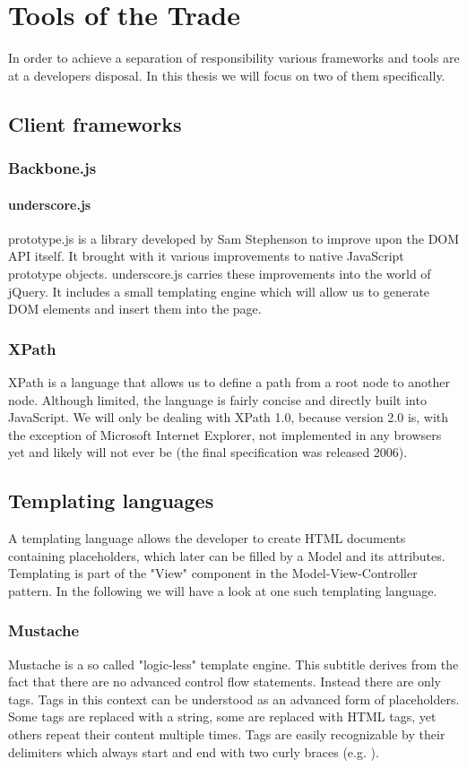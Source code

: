 \documentclass[thesis.tex]{subfiles}
\begin{document}
\chapter{Tools of the Trade}
\label{chap:tools}
In order to achieve a separation of responsibility various frameworks and tools
are at a developers disposal. In this thesis we will focus on two of them
specifically.
\section{Client frameworks}
\subsection{Backbone.js}
\subsubsection{underscore.js}
prototype.js is a library developed by Sam Stephenson to improve upon the
DOM API itself.
It brought with it various improvements to native JavaScript prototype objects.
underscore.js carries these improvements into the world of jQuery.
It includes a small templating engine which will allow us to generate
DOM elements and insert them into the page.
\subsection{XPath}
XPath is a language that allows us to define a path from a root node to another
node. Although limited, the language is fairly concise and directly built into
JavaScript. We will only be dealing with XPath 1.0, because version 2.0 is, with
the exception of Microsoft Internet Explorer, not implemented in any browsers
yet and likely will not ever be (the final specification was released 2006).
\section{Templating languages}
A templating language allows the developer to create HTML documents containing
placeholders, which later can be filled by a Model and its attributes.
Templating is part of the "View" component in the Model-View-Controller
pattern. In the following we will have a look at one such templating language.

\subsection{Mustache}
Mustache is a so called "logic-less" template engine.
This subtitle derives from the fact that there are no advanced control flow
statements. Instead there are only tags.
Tags in this context can be understood as an advanced form of placeholders.
Some tags are replaced with a string, some are replaced with HTML tags,
yet others repeat their content multiple times.
Tags are easily recognizable by their delimiters which always start and end with
two curly braces (e.g. ).
\end{document}
